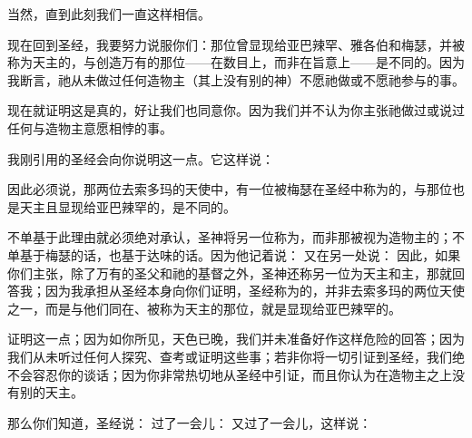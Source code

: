  当然，直到此刻我们一直这样相信。\par

现在回到圣经，我要努力说服你们：那位曾显现给亚巴辣罕、雅各伯和梅瑟，并被称为天主的，与创造万有的那位——在数目上，而非在旨意上——是不同的。因为我断言，祂从未做过任何造物主（其上没有别的神）不愿祂做或不愿祂参与的事。\par

现在就证明这是真的，好让我们也同意你。因为我们并不认为你主张祂做过或说过任何与造物主意愿相悖的事。\par

我刚引用的圣经会向你说明这一点。它这样说：\par

因此必须说，那两位去索多玛的天使中，有一位被梅瑟在圣经中称为的，与那位也是天主且显现给亚巴辣罕的，是不同的。\par

不单基于此理由就必须绝对承认，圣神将另一位称为，而非那被视为造物主的；不单基于梅瑟的话，也基于达味的话。因为他记着说： 又在另一处说： 因此，如果你们主张，除了万有的圣父和祂的基督之外，圣神还称另一位为天主和主，那就回答我；因为我承担从圣经本身向你们证明，圣经称为的，并非去索多玛的两位天使之一，而是与他们同在、被称为天主的那位，就是显现给亚巴辣罕的。\par

证明这一点；因为如你所见，天色已晚，我们并未准备好作这样危险的回答；因为我们从未听过任何人探究、查考或证明这些事；若非你将一切引证到圣经，我们绝不会容忍你的谈话；因为你非常热切地从圣经中引证，而且你认为在造物主之上没有别的天主。\par

那么你们知道，圣经说： 过了一会儿： 又过了一会儿，这样说：\par

